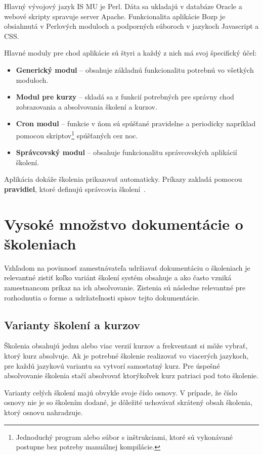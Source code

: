 \documentclass[
  digital,     %
  oneside,     %
  nosansbold,  %
  nocolorbold, %
  lof,         %
  nolot,         %
]{fithesis4}
\begin{document}
\noindent
Hlavný vývojový jazyk IS MU je Perl. Dáta sa ukladajú v databáze Oracle a webové skripty spravuje server Apache. Funkcionalita aplikácie Bozp je obsiahnutá v Perlových moduloch a podporných súboroch v jazykoch Javascript a CSS.

Hlavné moduly pre chod aplikácie sú štyri a každý z nich má svoj špecifický účel:

\begin{itemize}
    \item \textbf{Generický modul} – obsahuje základnú funkcionalitu potrebnú vo všetkých moduloch.
    \item \textbf{Modul pre kurzy} – skladá sa z funkcií potrebných pre správny chod zobrazovania a absolvovania školení a kurzov.
    \item \textbf{Cron modul} – funkcie v ňom sú spúšťané pravidelne a periodicky napríklad pomocou skriptov\footnote{Jednoduchý program alebo súbor s inštrukciami, ktoré sú vykonávané postupne bez potreby manuálnej kompilácie.} spúšťaných cez noc.
    \item \textbf{Správcovský modul} – obsahuje funkcionalitu správcovských aplikácií školení.
\end{itemize}

\noindent
Aplikácia dokáže školenia prikazovať automaticky. Príkazy zakladá pomocou \textbf{pravidiel}, ktoré definujú správcovia školení~\cite[15]{kandova2019}.

\section{Vysoké množstvo dokumentácie o školeniach}
Vzhľadom na povinnosť zamestnávateľa udržiavať dokumentáciu o školeniach je relevantné zistiť koľko variánt školení systém obsahuje a ako často vzniká zamestnancom príkaz na ich absolvovanie. Zistenia sú následne relevantné pre rozhodnutia o forme a udržateľnosti spisov tejto dokumentácie.

\subsection*{Varianty školení a kurzov}
Školenia obsahujú jednu alebo viac verzií kurzov a frekventant si môže vybrať, ktorý kurz absolvuje. Ak je potrebné školenie realizovať vo viacerých jazykoch, pre každú jazykovú variantu sa vytvorí samostatný kurz. Pre úspešné absolvovanie školenia stačí absolvovať ktorýkoľvek kurz patriaci pod toto školenie.

Varianty celých školení majú obvykle svoje číslo osnovy. V prípade, že číslo osnovy nie je so školením dodané, je dôležité uchovávať skrátený obsah školenia, ktorý osnovu nahradzuje.
\end{document}
